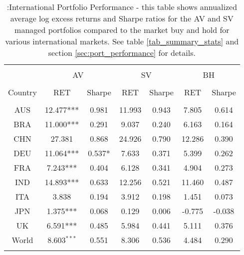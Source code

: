 
\begin{table}[!htbp] \centering 
  \caption{:International Portfolio Performance - this table shows annualized average log excess returns and Sharpe ratios for the AV and SV managed portfolios compared to the market buy and hold for various international markets. See table \ref{tab_summary_stats} and section \ref{sec:port_performance} for details.} 
  \label{tab:tab_intPerf1} 
\begin{tabular}{@{\extracolsep{5pt}} ccccccc} 
\\[-1.8ex]\hline 
\hline \\[-1.8ex]
& \multicolumn{2}{c}{AV} &\multicolumn{2}{c}{SV}& \multicolumn{2}{c}{BH}\\
\cline{2-3} \cline{4-5} \cline{6-7}\\
Country & RET & Sharpe & RET & Sharpe & RET & Sharpe \\ 
\hline \\[-1.8ex] 
AUS & 12.477*** & 0.981 & 11.993 & 0.943 & 7.805 & 0.614 \\ 
BRA & 11.000*** & 0.291 & 9.037 & 0.240 & 6.163 & 0.164 \\ 
CHN & 27.381 & 0.868 & 24.926 & 0.790 & 12.286 & 0.390 \\ 
DEU & 11.064*** & 0.537* & 7.633 & 0.371 & 5.399 & 0.262 \\ 
FRA & 7.243*** & 0.404 & 6.128 & 0.341 & 4.904 & 0.273 \\ 
IND & 14.893*** & 0.633 & 12.256 & 0.521 & 11.460 & 0.487 \\ 
ITA & 3.838 & 0.194 & 3.912 & 0.198 & 1.451 & 0.073 \\ 
JPN & 1.375*** & 0.068 & 0.129 & 0.006 & -0.775 & -0.038 \\ 
UK & 6.591*** & 0.485 & 5.984 & 0.441 & 5.111 & 0.376 \\ 
World & 8.603$^{***}$ & 0.551 &  8.306 & 0.536  & 4.484 & 0.290\\
\hline \\[-1.8ex] 
\end{tabular} 
\end{table} 
